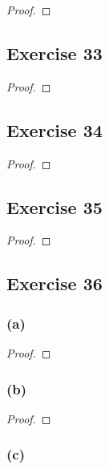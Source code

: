 \documentclass[14pt]{extarticle}
\begin{document}
\begin{proof}

\end{proof}

\subsection{Exercise 33}

\begin{proof}

\end{proof}

\subsection{Exercise 34}

\begin{proof}

\end{proof}

\subsection{Exercise 35}

\begin{proof}

\end{proof}

\subsection{Exercise 36}

\subsubsection{(a)}

\begin{proof}

\end{proof}

\subsubsection{(b)}

\begin{proof}

\end{proof}

\subsubsection{(c)}
\end{document}
